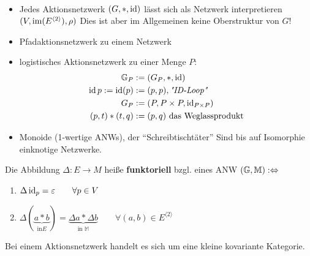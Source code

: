 \begin{beispiel}\
\begin{itemize}
\item Jedes Aktionsnetzwerk $(G, \ast, \operatorname{id})$ lässt sich als Netzwerk interpretieren \\$(V, \operatorname{im}(E^{\langle 2 \rangle}), \rho)$
Dies ist aber im Allgemeinen keine Oberstruktur von $G$!
\item Pfadaktionsnetzwerk zu einem Netzwerk
\item logistisches Aktionsnetzwerk zu einer Menge $P$:
\begin{align*}
\mathbb{G}_P&:=(G_P,\ast,\operatorname{id})\\
\operatorname{id} p:=\operatorname{id}(p)&:=(p,p), \textit{"ID-Loop"}\\
G_P&:=(P,P\times P,\operatorname{id}_{P\times P})\\
(p,t)\ast(t,q)&:=(p,q)\text{ das Weglassprodukt}
\end{align*}
\item Monoide (1-wertige ANWs), der ``Schreibtischtäter''
Sind bis auf Isomorphie einknotige Netzwerke.
\end{itemize}
\end{beispiel}

\begin{definition}
Die Abbildung $\Delta:E\to M$ heiße \textbf{funktoriell} bzgl. eines ANW $(\mathbb{G},\mathbb{M}):\Leftrightarrow$ 
\begin{enumerate}
\item $\Delta \operatorname{id}_p=\varepsilon\qquad\forall p\in V$
\item $\Delta (\underbrace{a\ast b}_{\text{in} E})=\underbrace{\Delta a\ast\Delta b}_{\text{in }\mathbb{M}}\qquad\forall(a,b)\in E^{\langle2\rangle}$
\end{enumerate}
\end{definition}

\begin{bemerkung}
Bei einem Aktionsnetzwerk handelt es sich um eine kleine kovariante Kategorie.
\end{bemerkung}

